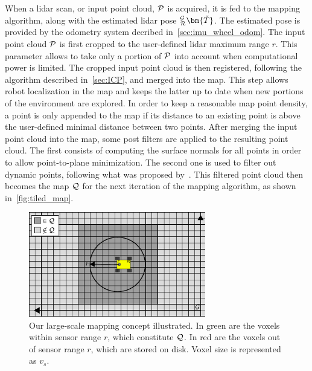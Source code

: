 When a lidar scan, or input point cloud, $\mathcal{P}$ is acquired, it is fed to the mapping algorithm, along with the estimated lidar pose $_{\robotf}^{\mapf}\bm{\check{T}}$. %
The estimated pose is provided by the odometry system decribed in~\autoref{sec:imu_wheel_odom}.
The input point cloud  $\mathcal{P}$ is first cropped to the user-defined lidar maximum range $r$. %
This parameter allows to take only a portion of $\mathcal{P}$ into account when computational power is limited.
The cropped input point cloud is then registered, following the algorithm described in~\autoref{sec:ICP}, and merged into the map.
This step allows robot localization in the map and keeps the latter up to date when new portions of the environment are explored.
In order to keep a reasonable map point density, a point is only appended to the map if its distance to an existing point is above the user-defined minimal distance between two points.
After merging the input point cloud into the map, some post filters are applied to the resulting point cloud.
The first consists of computing the surface normals for all points in order to allow point-to-plane minimization.
The second one is used to filter out dynamic points, following what was proposed by~\citet{Pomerleau2014}.
This filtered point cloud then becomes the map $\mathcal{Q}$ for the next iteration of the mapping algorithm, as shown in~\autoref{fig:tiled_map}.

\begin{figure}
	\centering
	\includegraphics[height=1.8in]{figs/tiled_mapping/tiled_mapping.pdf}
	\caption{Our large-scale mapping concept illustrated.
		In green are the voxels within sensor range $r$, which constitute $\mathcal{Q}$.
		In red are the voxels out of sensor range $r$, which are stored on disk.
		Voxel size is represented as $v_s$.}
	\label{fig:tiled_map}
\end{figure}

